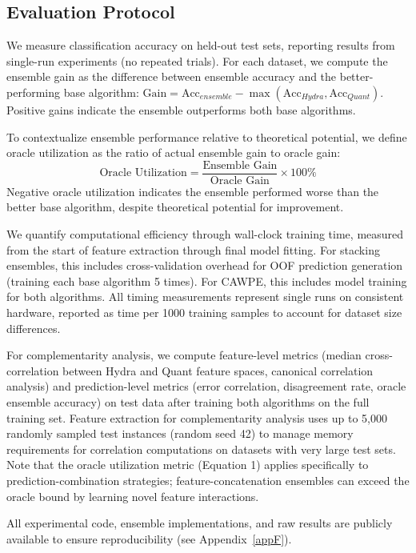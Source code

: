 \documentclass[pdflatex,sn-basic]{sn-jnl}           %
\theoremstyle{thmstyleone}%
\theoremstyle{thmstyletwo}%
\theoremstyle{thmstylethree}%
\begin{document}
\subsection{Evaluation Protocol}

We measure classification accuracy on held-out test sets, reporting results from single-run experiments (no repeated trials). For each dataset, we compute the ensemble gain as the difference between ensemble accuracy and the better-performing base algorithm: $\text{Gain} = \text{Acc}_{ensemble} - \max(\text{Acc}_{Hydra}, \text{Acc}_{Quant})$. Positive gains indicate the ensemble outperforms both base algorithms.

To contextualize ensemble performance relative to theoretical potential, we define oracle utilization as the ratio of actual ensemble gain to oracle gain:
\begin{equation}
\text{Oracle Utilization} = \frac{\text{Ensemble Gain}}{\text{Oracle Gain}} \times 100\%
\end{equation}
Negative oracle utilization indicates the ensemble performed worse than the better base algorithm, despite theoretical potential for improvement.

We quantify computational efficiency through wall-clock training time, measured from the start of feature extraction through final model fitting. For stacking ensembles, this includes cross-validation overhead for OOF prediction generation (training each base algorithm 5 times). For CAWPE, this includes model training for both algorithms. All timing measurements represent single runs on consistent hardware, reported as time per 1000 training samples to account for dataset size differences.

For complementarity analysis, we compute feature-level metrics (median cross-correlation between Hydra and Quant feature spaces, canonical correlation analysis) and prediction-level metrics (error correlation, disagreement rate, oracle ensemble accuracy) on test data after training both algorithms on the full training set. Feature extraction for complementarity analysis uses up to 5,000 randomly sampled test instances (random seed 42) to manage memory requirements for correlation computations on datasets with very large test sets. Note that the oracle utilization metric (Equation 1) applies specifically to prediction-combination strategies; feature-concatenation ensembles can exceed the oracle bound by learning novel feature interactions.

All experimental code, ensemble implementations, and raw results are publicly available to ensure reproducibility (see Appendix~\ref{appF}).
\end{document}
